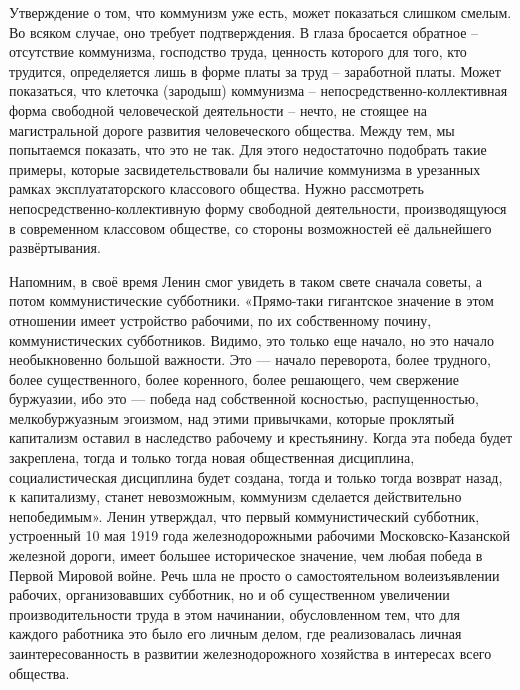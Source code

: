 \documentclass[12pt,a4paper,openany]{book}
\begin{document}
Утверждение о том, что коммунизм уже есть, может показаться слишком смелым. Во всяком случае, оно требует подтверждения. В глаза бросается обратное – отсутствие коммунизма, господство труда, ценность которого для того, кто трудится, определяется лишь в форме платы за труд – заработной платы. Может показаться, что клеточка (зародыш) коммунизма – непосредственно-коллективная форма свободной человеческой деятельности – нечто, не стоящее на магистральной дороге развития человеческого общества. Между тем, мы попытаемся показать, что это не так. Для этого недостаточно подобрать такие примеры, которые засвидетельствовали бы наличие коммунизма в урезанных рамках эксплуататорского классового общества. Нужно рассмотреть непосредственно-коллективную форму свободной деятельности, производящуюся в современном классовом обществе, со стороны возможностей её дальнейшего развёртывания.

Напомним, в своё время Ленин смог увидеть в таком свете сначала советы, а потом коммунистические субботники. «Прямо-таки гигантское значение в этом отношении имеет устройство рабочими, по их собственному почину, коммунистических субботников. Видимо, это только еще начало, но это начало необыкновенно большой важности. Это — начало переворота, более трудного, более существенного, более коренного, более решающего, чем свержение буржуазии, ибо это — победа над собственной косностью, распущенностью, мелкобуржуазным эгоизмом, над этими привычками, которые проклятый капитализм оставил в наследство рабочему и крестьянину. Когда эта победа будет закреплена, тогда и только тогда новая общественная дисциплина, социалистическая дисциплина будет создана, тогда и только тогда возврат назад, к капитализму, станет невозможным, коммунизм сделается действительно непобедимым». Ленин утверждал, что первый коммунистический субботник, устроенный 10 мая 1919 года железнодорожными рабочими Московско-Казанской железной дороги, имеет большее историческое значение, чем любая победа в Первой Мировой войне. Речь шла не просто о самостоятельном волеизъявлении рабочих, организовавших субботник, но и об существенном увеличении производительности труда в этом начинании, обусловленном тем, что для каждого работника это было его личным делом, где реализовалась личная заинтересованность в развитии железнодорожного хозяйства в интересах всего общества.
\end{document}
